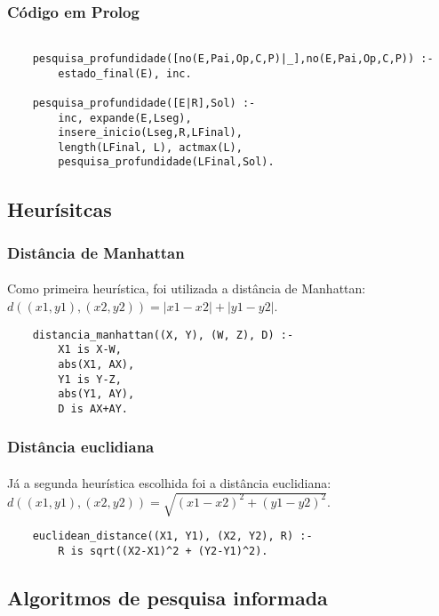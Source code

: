 \documentclass{article}
\begin{document}
\subsubsection{Código em Prolog}
\begin{verbatim}

    pesquisa_profundidade([no(E,Pai,Op,C,P)|_],no(E,Pai,Op,C,P)) :- 
        estado_final(E), inc.
        
    pesquisa_profundidade([E|R],Sol) :- 
        inc, expande(E,Lseg),
        insere_inicio(Lseg,R,LFinal),
        length(LFinal, L), actmax(L),
        pesquisa_profundidade(LFinal,Sol).
\end{verbatim}

\subsection{Heurísitcas}
\subsubsection{Distância de Manhattan}
\paragraph{} Como primeira heurística, foi utilizada a distância de Manhattan: $d((x1, y1), (x2, y2)) = |x1 - x2| + |y1 - y2|$.


\begin{verbatim}
    distancia_manhattan((X, Y), (W, Z), D) :-
        X1 is X-W,
        abs(X1, AX),
        Y1 is Y-Z,
        abs(Y1, AY),
        D is AX+AY.  
\end{verbatim}

\subsubsection{Distância euclidiana}
\paragraph{} Já a segunda heurística escolhida foi a distância euclidiana: $d((x1, y1), (x2, y2)) = \sqrt{(x1-x2)^2 + (y1-y2)^2}$.

\begin{verbatim}
    euclidean_distance((X1, Y1), (X2, Y2), R) :- 
        R is sqrt((X2-X1)^2 + (Y2-Y1)^2). 
\end{verbatim}

\subsection{Algoritmos de pesquisa informada}
\end{document}
